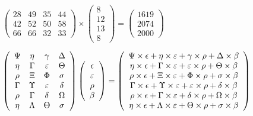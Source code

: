 \documentclass[12pt]{article}
\begin{document}
 
 
\noindent{}
 
 

 
$\left( \begin{array}{ccccccccccccccc}
          28  & 
          49  & 
          35  & 
          44  \\ 
          42  & 
          52  & 
          50  & 
          58  \\ 
          66  & 
          66  & 
          32  & 
          33
\end{array}\right) \times
\left( \begin{array}{c}
           8  \\ 
          12  \\ 
          13  \\ 
           8
\end{array}\right)  =
\left( \begin{array}{c}
        1619  \\ 
        2074  \\ 
        2000
\end{array}\right)  $
 
$  %
 \left( \begin{array}
 {
 c
 c
 c
 c
 }
 \Psi & 
 \eta & 
 \gamma & 
 \Delta \\ 
 \eta & 
 \Gamma & 
 \varepsilon & 
 \Theta \\ 
 \rho & 
                    \Xi & 
 \Phi & 
 \sigma \\ 
 \Gamma & 
 \Upsilon & 
 \varepsilon & 
 \delta \\ 
 \rho & 
 \Gamma & 
 \delta & 
 \Omega \\ 
 \eta & 
 \Lambda & 
 \Theta & 
 \sigma
 \end{array} \right)
 \left( \begin{array}
 {
 c
 }
 \epsilon \\ 
 \varepsilon \\ 
 \rho \\ 
 \beta
 \end{array} \right)
=
 \left( \begin{array}
 {
 c
 }
  \Psi \times  \epsilon +  \eta \times  \varepsilon +  \gamma \times  \rho +  \Delta \times  \beta \\ 
  \eta \times  \epsilon +  \Gamma \times  \varepsilon +  \varepsilon \times  \rho +  \Theta \times  \beta \\ 
  \rho \times  \epsilon +                     \Xi \times  \varepsilon +  \Phi \times  \rho +  \sigma \times  \beta \\ 
  \Gamma \times  \epsilon +  \Upsilon \times  \varepsilon +  \varepsilon \times  \rho +  \delta \times  \beta \\ 
  \rho \times  \epsilon +  \Gamma \times  \varepsilon +  \delta \times  \rho +  \Omega \times  \beta \\ 
  \eta \times  \epsilon +  \Lambda \times  \varepsilon +  \Theta \times  \rho +  \sigma \times  \beta
 \end{array} \right)
$
 
\end{document}
